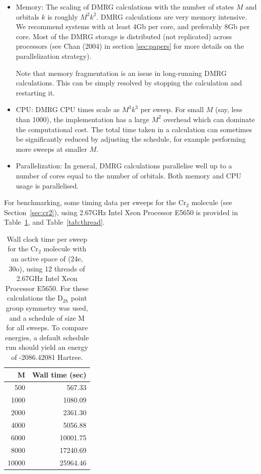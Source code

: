 \documentclass[letterpaper,12pt,aps, pra]{revtex4-1}
\begin{document}
\begin{itemize}
\item Memory: The scaling of DMRG calculations with the number of states $M$ and orbitals $k$ is roughly $M^2 k^2$.
DMRG calculations are very memory intensive. We recommend systems with at least 4Gb per core, and preferably 8Gb per core. Most
of the DMRG storage is distributed (not replicated) across processors (see Chan (2004) in section \ref{sec:papers} for more details
on the parallelization strategy).

Note that memory fragmentation is an issue in long-running DMRG calculations. This can be simply resolved by stopping the calculation and restarting it.
\item CPU: DMRG CPU times scale as $M^3 k^3$ per sweep. For small $M$ (say, less than 1000), the implementation has a
large $M^2$ overhead which can dominate the computational cost. The total time taken in a calculation can sometimes
be significantly reduced by adjusting the schedule, for example performing more sweeps at smaller $M$.
\item Parallelization: In general, DMRG calculations parallelise well up to a number of cores equal to the number of orbitals. Both
memory and CPU usage is parallelised.
\end{itemize}

For benchmarking, some timing data per sweeps for the Cr$_2$ molecule (see
Section~\ref{sec:cr2}), using 2.67GHz Intel Xeon Processor E5650 is provided in
Table~\ref{tab:timing}, and Table~\ref{tab:thread}.

\begin{table}
\begin{center}
\begin{tabular}{rr}
\hline
\hline
M& Wall time (sec)\\
\hline
500     &567.33\\
1000	&1080.09\\
2000	&2361.30\\
4000	&5056.88\\
6000	&10001.75\\
8000	&17240.69\\
10000	&25964.46\\
\hline
\hline
\end{tabular}
\end{center}
\caption{Wall clock time per sweep for the Cr$_2$ molecule with an active space
of (24e, 30o), using 12 threads of 2.67GHz Intel Xeon Processor E5650. For
these calculations the D$_{2h}$ point group symmetry was used, and a schedule
of size M for all sweeps.
To compare energies, a default schedule run should yield an energy of -2086.42081 Hartree.
} \label{tab:timing}
\end{table}
\end{document}
